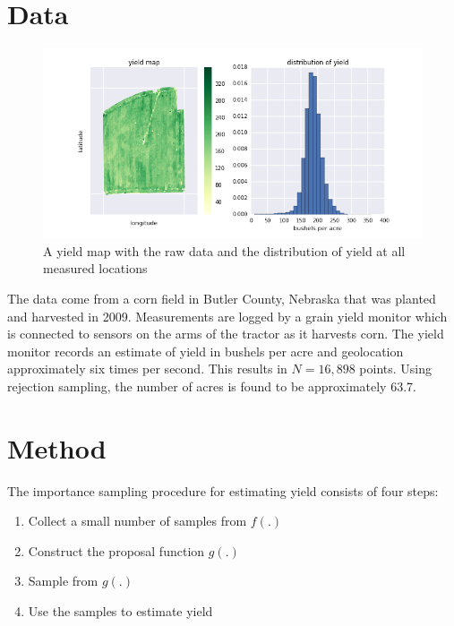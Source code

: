 \documentclass[thesis]{hmcposter}
\begin{document}
\begin{poster}
\vspace{12pt}

\section{Data}

\begin{figure}
\begin{center}
\includegraphics[width=15in]{figures/raw_data}
\caption{A yield map with the raw data and the distribution of yield at all measured locations}%
\label{fig:county_yield}
\end{center}
\end{figure}

The data come from a corn field in Butler County, Nebraska that was planted and harvested in 2009. Measurements are logged by a grain yield monitor which is connected to sensors on the arms of the tractor as it harvests corn. The yield monitor records an estimate of yield in bushels per acre and geolocation approximately six times per second. This results in $N = 16,898$ points. Using rejection sampling, the number of acres is found to be approximately 63.7.

\section{Method}

The importance sampling procedure for estimating yield consists of four steps:
\begin{enumerate}
\item Collect a small number of samples from $f(.)$
\item Construct the proposal function $g(.)$
\item Sample from $g(.)$
\item Use the samples to estimate yield
\end{enumerate}


\end{poster}
\end{document}
